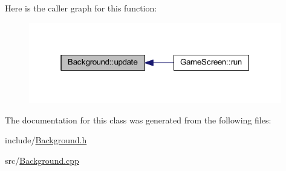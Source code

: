 Here is the caller graph for this function\+:
\nopagebreak
\begin{figure}[H]
\begin{center}
\leavevmode
\includegraphics[width=313pt]{class_background_ae9ead480fcfa060468305134b11e1f40_icgraph}
\end{center}
\end{figure}


The documentation for this class was generated from the following files\+:\begin{DoxyCompactItemize}
\item 
include/\hyperlink{_background_8h}{Background.\+h}\item 
src/\hyperlink{_background_8cpp}{Background.\+cpp}\end{DoxyCompactItemize}
